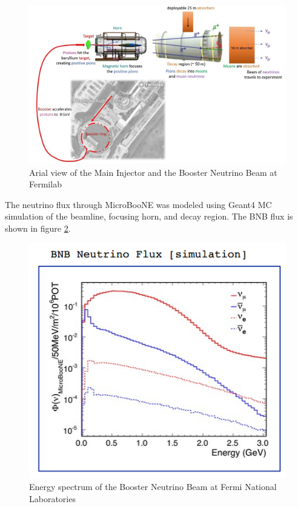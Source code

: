 \begin{figure}[htp!]
\centering
\includegraphics[width=.6\textwidth]{figs/BNB_layout.jpg}
\caption{Arial view of the Main Injector and the Booster Neutrino Beam at Fermilab}
\label{fig:bnb}
\end{figure}

The neutrino flux through MicroBooNE was modeled using Geant4 MC simulation of the beamline, focusing horn, and decay region. The BNB flux is shown in figure \ref{fig:bnbflux}. 

\begin{figure}[htp!]
\centering
\includegraphics[width=.6\textwidth]{figs/bnbflux.png}
\caption{Energy spectrum of the Booster Neutrino Beam at Fermi National Laboratories}
\label{fig:bnbflux}
\end{figure}


